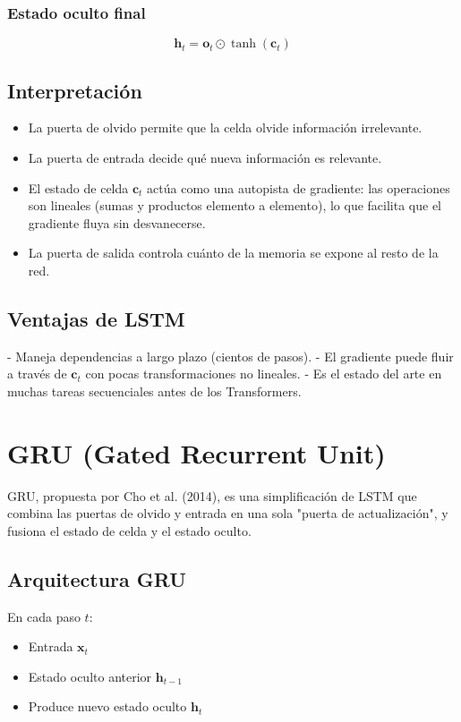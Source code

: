 \documentclass[12pt,a4paper,openany,oneside]{book}
\begin{document}
\subsubsection{Estado oculto final}
\begin{equation}
\mathbf{h}_t = \mathbf{o}_t \odot \tanh(\mathbf{c}_t)
\end{equation}

\subsection{Interpretación}
\begin{itemize}
    \item La puerta de olvido permite que la celda olvide información irrelevante.
    \item La puerta de entrada decide qué nueva información es relevante.
    \item El estado de celda \(\mathbf{c}_t\) actúa como una autopista de gradiente: las operaciones son lineales (sumas y productos elemento a elemento), lo que facilita que el gradiente fluya sin desvanecerse.
    \item La puerta de salida controla cuánto de la memoria se expone al resto de la red.
\end{itemize}

\subsection{Ventajas de LSTM}
- Maneja dependencias a largo plazo (cientos de pasos).
- El gradiente puede fluir a través de \(\mathbf{c}_t\) con pocas transformaciones no lineales.
- Es el estado del arte en muchas tareas secuenciales antes de los Transformers.

\section{GRU (Gated Recurrent Unit)}

GRU, propuesta por Cho et al. (2014), es una simplificación de LSTM que combina las puertas de olvido y entrada en una sola "puerta de actualización", y fusiona el estado de celda y el estado oculto.

\subsection{Arquitectura GRU}
En cada paso \(t\):
\begin{itemize}
    \item Entrada \(\mathbf{x}_t\)
    \item Estado oculto anterior \(\mathbf{h}_{t-1}\)
    \item Produce nuevo estado oculto \(\mathbf{h}_t\)
\end{itemize}
\end{document}
